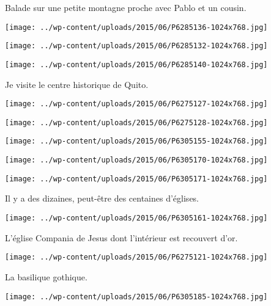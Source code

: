 Balade sur une petite montagne proche avec Pablo et un cousin. 
\begin{center} 
\texttt{[image: ../wp-content/uploads/2015/06/P6285136-1024x768.jpg]} 
\end{center}
\begin{center} 
\texttt{[image: ../wp-content/uploads/2015/06/P6285132-1024x768.jpg]} 
\end{center}
\begin{center} 
\texttt{[image: ../wp-content/uploads/2015/06/P6285140-1024x768.jpg]} 
\end{center}
\pagebreak

Je visite le centre historique de Quito. 
\begin{center} 
\texttt{[image: ../wp-content/uploads/2015/06/P6275127-1024x768.jpg]} 
\end{center}
\begin{center} 
\texttt{[image: ../wp-content/uploads/2015/06/P6275128-1024x768.jpg]} 
\end{center}
\begin{center} 
\texttt{[image: ../wp-content/uploads/2015/06/P6305155-1024x768.jpg]} 
\end{center}
\begin{center} 
\texttt{[image: ../wp-content/uploads/2015/06/P6305170-1024x768.jpg]} 
\end{center}
\begin{center} 
\texttt{[image: ../wp-content/uploads/2015/06/P6305171-1024x768.jpg]} 
\end{center}

Il y a des dizaines, peut-être des centaines d'églises. 
\begin{center} 
\texttt{[image: ../wp-content/uploads/2015/06/P6305161-1024x768.jpg]}
\end{center}
\pagebreak

L'église Compania de Jesus dont l'intérieur est recouvert d'or. 
\begin{center} 
\texttt{[image: ../wp-content/uploads/2015/06/P6275121-1024x768.jpg]} 
\end{center}

La basilique gothique. 
\begin{center} 
\texttt{[image: ../wp-content/uploads/2015/06/P6305185-1024x768.jpg]} 
\end{center}

